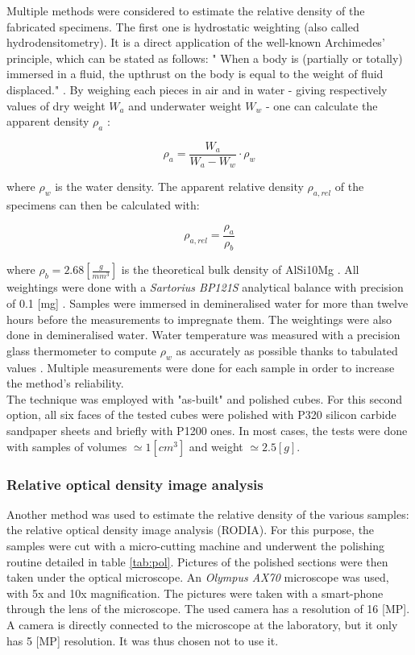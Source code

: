 Multiple methods were considered to estimate the relative density of the fabricated specimens. The first one is hydrostatic weighting (also called hydrodensitometry). It is a direct application of the well-known Archimedes' principle, which can be stated as follows: " When a body is (partially or totally) immersed in a fluid, the upthrust on the body is equal to the weight of fluid displaced." \parencite{ADictionaryofPhysics}. By weighing each pieces in air and in water - giving respectively values of dry weight $W_a$ and underwater weight $W_w$ - one can calculate the apparent density $\rho_a$ \parencite{MethArch}:

$$\rho_a=\frac{W_a}{W_a-W_w} \cdot \rho_w $$

where $\rho_w$ is the water density. The apparent relative density $\rho_{a,rel}$ of the specimens can then be calculated with:

$$\rho_{a,rel} = \frac{\rho_a}{\rho_b} $$

where $\rho_b = 2.68 [\frac{g}{mm^3}]$ is the theoretical bulk density of AlSi10Mg \parencite{Bulk}. All weightings were done with a \textit{Sartorius BP121S} analytical balance with precision of 0.1 [mg] \parencite{Balance}. Samples were immersed in demineralised water for more than twelve hours before the measurements to impregnate them. The weightings were also done in demineralised water. Water temperature was measured with a precision glass thermometer to compute $\rho_w$ as accurately as possible thanks to tabulated values \parencite{Eau}. Multiple measurements were done for each sample in order to increase the method's reliability. \\

The technique was employed with "as-built" and polished cubes. For this second option, all six faces of the tested cubes were polished with P320 silicon carbide sandpaper sheets and briefly with P1200 ones. In most cases, the tests were done with samples of volumes $\simeq 1 [cm^3]$ and weight $\simeq 2.5 [g]$.\\

\subsubsection{Relative optical density image analysis}

Another method was used to estimate the relative density of the various samples: the relative optical density image analysis (RODIA). For this purpose, the samples were cut with a micro-cutting machine and underwent the polishing routine detailed in table \ref{tab:pol}. Pictures of the polished sections were then taken under the optical microscope. An \textit{Olympus AX70} microscope was used, with 5x and 10x magnification. The pictures were taken with a smart-phone through the lens of the microscope. The used camera has a resolution of 16 [MP]. A camera is directly connected to the microscope at the laboratory, but it only has 5 [MP] resolution. It was thus chosen not to use it. \\

